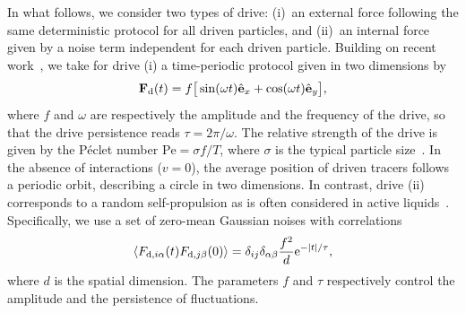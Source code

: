 \documentclass[superscriptaddress, twocolumn, prx, longbibliography, nofootinbib]{revtex4-1}
\begin{document}
In what follows, we consider two types of drive: (i)~an external force following the same deterministic protocol for all driven particles, and (ii)~an internal force given by a noise term independent for each driven particle. Building on recent work~\cite{Han2016, delJunco2018}, we take for drive (i) a time-periodic protocol given in two dimensions by
\begin{equation}\label{eq:theta}
	{\bf F}_{\rm d}(t) = f \big[\sin(\omega t) \hat{\bf e}_x + \cos(\omega t)\hat{\bf e}_y \big] ,
\end{equation}
where $f$ and $\omega$ are respectively the amplitude and the frequency of the drive, so that the drive persistence reads $\tau=2\pi/\omega$. The relative strength of the drive is given by the P\'eclet number $\text{Pe} = \sigma f/T$, where $\sigma$ is the typical particle size~\cite{Han2016, delJunco2018}. In the absence of interactions ($v=0$), the average position of driven tracers follows a periodic orbit, describing a circle in two dimensions. In contrast, drive (ii) corresponds to a random self-propulsion as is often considered in active liquids~\cite{Fily2012, Redner2013, Maggi2015}. Specifically, we use a set of zero-mean Gaussian noises with correlations
\begin{equation}\label{eq:theta_ac}
	\langle F_{{\rm d},i\alpha}(t) F_{{\rm d},j\beta}(0) \rangle = \delta_{ij}\delta_{\alpha\beta} \frac{f^2}{d} {\rm e}^{-|t|/\tau} ,
\end{equation}
where $d$ is the spatial dimension. The parameters $f$ and $\tau$ respectively control the amplitude and the persistence of fluctuations.
\end{document}
